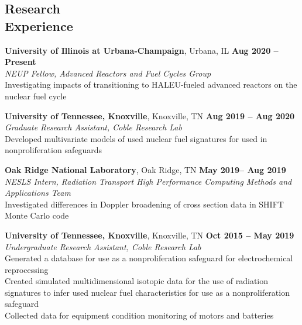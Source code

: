 \documentclass[margin,line]{resume}
\begin{document}
\begin{resume}
    \section{\mysidestyle Research\\Experience}
    \textbf{University of Illinois at Urbana-Champaign}, Urbana, IL \hfill \textbf{Aug 2020 -- Present} \\
                \textsl{NEUP Fellow, Advanced Reactors and Fuel Cycles Group} \\
                Investigating impacts of transitioning to HALEU-fueled advanced 
                reactors on the nuclear fuel cycle

    \textbf{University of Tennessee, Knoxville}, Knoxville, TN \hfill \textbf{Aug 2019 -- Aug 2020}\\
                \textsl{Graduate Research Assistant, Coble Research Lab} \\ 
                Developed multivariate models of used nuclear fuel signatures for 
                used in nonproliferation safeguards 

    \textbf{Oak Ridge National Laboratory}, Oak Ridge, TN \hfill \textbf{May 2019-- Aug 2019}\\
                \textsl{NESLS Intern, Radiation Transport High Performance Computing Methods and Applications Team}\\
                Investigated differences in Doppler broadening of cross section data in SHIFT Monte Carlo code

    \textbf{University of Tennessee, Knoxville}, Knoxville, TN \hfill \textbf{Oct 2015 -- May 2019}\\
                \textsl{Undergraduate Research Assistant, Coble Research Lab}\\
                Generated a database for use as a nonproliferation safeguard for electrochemical reprocessing \\
                Created simulated multidimensional isotopic data for the use of radiation signatures to infer used nuclear fuel characteristics for use as a nonproliferation safeguard\\ 
                Collected data for equipment condition monitoring of motors and batteries

\end{resume}
\end{document}
